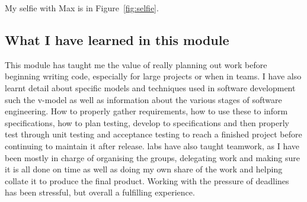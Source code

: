 My selfie with Max is in  Figure~\ref{fig:selfie}.

\subsection{What I have learned in this module}
This module has taught me the value of really planning out work before beginning writing code, especially for large projects or when in teams. I have also learnt detail about specific models and techniques used in software development such the v-model as well as information about the various stages of software engineering. How to properly gather requirements, how to use these to inform specifications, how to plan testing, develop to specifications and then properly test through unit testing and acceptance testing to reach a finished project before continuing to maintain it after release. labs have also taught teamwork, as I have been mostly in charge of organising the groups, delegating work and making sure it is all done on time as well as doing my own share of the work and helping collate it to produce the final product. Working with the pressure of deadlines has been stressful, but overall a fulfilling experience.
